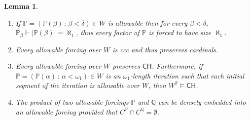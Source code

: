 \documentclass[a4paper,11pt]{article}
\newtheorem{lemma}[theorem]{Lemma}
\newcommand{\forceP}{\mathbb{P}}
\newcommand{\forceQ}{\mathbb{Q}}
\newcommand{\CH}{\mathsf{CH}}
\begin{document}
 \begin{lemma} \label{FirstPropertiesOfAllowableForcings}


\begin{enumerate}
\item If $\forceP=(\forceP(\beta) \, : \, \beta < \delta) \in W$ is allowable then for every $\beta < \delta$, $\forceP_{\beta} \Vdash| \forceP(\beta)|= \aleph_1$, thus every factor of $\forceP$ is forced to have size $\aleph_1$.
\item Every allowable forcing over $W$ is ccc and thus preserves cardinals.
\item Every allowable forcing over $W$ preserves $\CH$. Furthermore, if $\forceP= (\forceP(\alpha) \, : \, \alpha < \omega_1) \in W$ is an $\omega_1$-length iteration such that each initial segment of the iteration is allowable over $W$, then $W^{\forceP} \models \CH$.
\item The product of two allowable forcings $\forceP$ and $\forceQ$ can be densely embedded into an allowable forcing provided that $C^{\forceP} \cap C^{\forceQ}=\emptyset$.
\end{enumerate}
\end{lemma}
\end{document}
